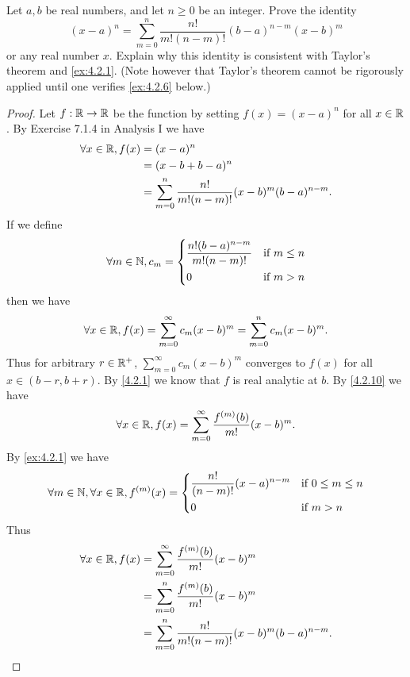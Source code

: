 \begin{ex}\label{ex:4.2.5}
  Let \(a, b\) be real numbers, and let \(n \geq 0\) be an integer.
  Prove the identity
  \[
    (x - a)^n = \sum_{m = 0}^n \dfrac{n!}{m! (n - m)!} (b - a)^{n - m} (x - b)^m
  \]
  or any real number \(x\).
  Explain why this identity is consistent with Taylor's theorem and \cref{ex:4.2.1}.
  (Note however that Taylor's theorem cannot be rigorously applied until one verifies \cref{ex:4.2.6} below.)
\end{ex}

\begin{proof}
  Let \(f : \mathbb{R} \to \mathbb{R}\) be the function by setting \(f(x) = (x - a)^n\) for all \(x \in \mathbb{R}\).
  By Exercise 7.1.4 in Analysis I we have
  \begin{align*}
    \forall x \in \mathbb{R}, f(x) & = (x - a)^n                                                         \\
                           & = (x - b + b - a)^n                                                 \\
                           & = \sum_{m = 0}^n \dfrac{n!}{m! (n - m)!} (x - b)^m (b - a)^{n - m}.
  \end{align*}
  If we define
  \[
    \forall m \in \mathbb{N}, c_m = \begin{dcases}
      \dfrac{n! (b - a)^{n - m}}{m! (n - m)!} & \text{if } m \leq n \\
      0                                       & \text{if } m > n
    \end{dcases}
  \]
  then we have
  \[
    \forall x \in \mathbb{R}, f(x) = \sum_{m = 0}^\infty c_m (x - b)^m = \sum_{m = 0}^n c_m (x - b)^m.
  \]
  Thus for arbitrary \(r \in \mathbb{R}^+\), \(\sum_{m = 0}^\infty c_m (x - b)^m\) converges to \(f(x)\) for all \(x \in (b - r, b + r)\).
  By \cref{4.2.1} we know that \(f\) is real analytic at \(b\).
  By \cref{4.2.10} we have
  \begin{align*}
    \forall x \in \mathbb{R}, f(x) = \sum_{m = 0}^\infty \dfrac{f^{(m)}(b)}{m!} (x - b)^m.
  \end{align*}
  By \cref{ex:4.2.1} we have
  \[
    \forall m \in \mathbb{N}, \forall x \in \mathbb{R}, f^{(m)}(x) = \begin{dcases}
      \dfrac{n!}{(n - m)!} (x - a)^{n - m} & \text{if } 0 \leq m \leq n \\
      0                                    & \text{if } m > n
    \end{dcases}
  \]
  Thus
  \begin{align*}
    \forall x \in \mathbb{R}, f(x) & = \sum_{m = 0}^\infty \dfrac{f^{(m)}(b)}{m!} (x - b)^m              \\
                           & = \sum_{m = 0}^n \dfrac{f^{(m)}(b)}{m!} (x - b)^m                   \\
                           & = \sum_{m = 0}^n \dfrac{n!}{m! (n - m)!} (x - b)^m (b - a)^{n - m}.
  \end{align*}
\end{proof}

